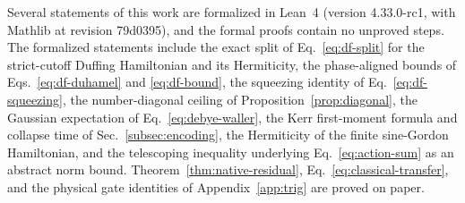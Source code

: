 \documentclass[pra,twocolumn,superscriptaddress,nofootinbib,floatfix]{revtex4-2}
\theoremstyle{remark}
\newcommand{\revcolor}{\color{blue}}
\DeclareRobustCommand{\rev}[1]{{\revcolor #1}}
\begin{document}
\rev{Several statements of this work are formalized in Lean~4 (version 4.33.0-rc1, with Mathlib at revision 79d0395), and the formal proofs contain no unproved steps.} \rev{The formalized statements include the exact split of Eq.~\eqref{eq:df-split} for the strict-cutoff Duffing Hamiltonian and its Hermiticity, the phase-aligned bounds of Eqs.~\eqref{eq:df-duhamel} and \eqref{eq:df-bound}, the squeezing identity of Eq.~\eqref{eq:df-squeezing}, the number-diagonal ceiling of Proposition~\ref{prop:diagonal}, the Gaussian expectation of Eq.~\eqref{eq:debye-waller}, the Kerr first-moment formula and collapse time of Sec.~\ref{subsec:encoding}, the Hermiticity of the finite sine-Gordon Hamiltonian, and the telescoping inequality underlying Eq.~\eqref{eq:action-sum} as an abstract norm bound.} \rev{Theorem~\ref{thm:native-residual}, Eq.~\eqref{eq:classical-transfer}, and the physical gate identities of Appendix~\ref{app:trig} are proved on paper.}
\end{document}

